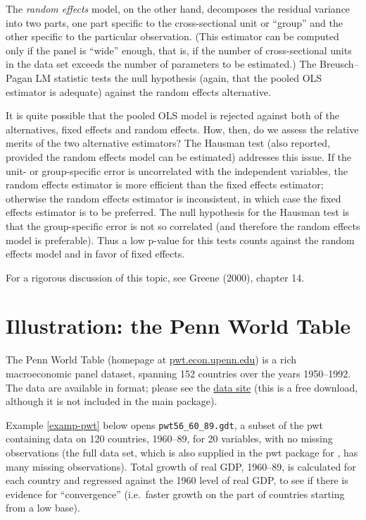 The \emph{random effects} model, on the other hand, decomposes the
residual variance into two parts, one part specific to the
cross-sectional unit or ``group'' and the other specific to the
particular observation.  (This estimator can be computed only if the
panel is ``wide'' enough, that is, if the number of cross-sectional
units in the data set exceeds the number of parameters to be
estimated.)  The Breusch--Pagan LM statistic tests the null hypothesis
(again, that the pooled OLS estimator is adequate) against the random
effects alternative.

It is quite possible that the pooled OLS model is rejected against
both of the alternatives, fixed effects and random effects. How, then,
do we assess the relative merits of the two alternative estimators?
The Hausman test (also reported, provided the random effects model can
be estimated) addresses this issue.  If the unit- or group-specific
error is uncorrelated with the independent variables, the random
effects estimator is more efficient than the fixed effects estimator;
otherwise the random effects estimator is inconsistent, in which case
the fixed effects estimator is to be preferred.  The null hypothesis
for the Hausman test is that the group-specific error is not so
correlated (and therefore the random effects model is preferable).
Thus a low p-value for this tests counts against the random effects
model and in favor of fixed effects.

For a rigorous discussion of this topic, see Greene (2000), chapter
14.

\section{Illustration: the Penn World Table}
\label{PWT}

The Penn World Table (homepage at
\href{http://pwt.econ.upenn.edu/}{pwt.econ.upenn.edu}) is a rich
macroeconomic panel dataset, spanning 152 countries over the years
1950--1992.  The data are available in  format; please see
the 
\href{http://gretl.sourceforge.net/gretl_data.html}{data site} (this
is a free download, although it is not included in the main
 package).

Example \ref{examp-pwt} below opens \verb+pwt56_60_89.gdt+, a subset
of the pwt containing data on 120 countries, 1960--89, for 20
variables, with no missing observations (the full data set, which is
also supplied in the pwt package for , has many missing
observations). Total growth of real GDP, 1960--89, is calculated for
each country and regressed against the 1960 level of real GDP, to see
if there is evidence for ``convergence'' (i.e.\ faster growth on the
part of countries starting from a low base).

